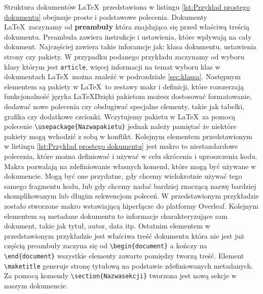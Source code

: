

Struktura dokumentów \LaTeX\ przedstawiona w listingu \ref{lst:Przykład prostego dokumentu} obejmuje proste i podstawowe polecenia. Dokumenty \LaTeX\ zaczynamy od \textbf{preambuły} która znajdująca się przed właściwą treścią dokumentu. Preambuła zawiera instrukcje i ustawienia, które wpływają na cały dokument. Najczęściej zawiera takie inforamcje jak: klasa dokumentu, ustawienia strony czy pakiety. W przypadku podanego przykładu zaczynamy od wyboru klasy którym jest \texttt{article}, więcej informacji na temat wyboru klas w dokumentach \LaTeX\ można znaleźć w podrozdziale \ref{sec:klassa}. Następnym elementem są pakiety w \LaTeX\ to zestawy makr i definicji, które rozszerzają funkcjonalność języka \LaTeX\. Dzięki pakietom możesz dostosować formatowanie, dodawać nowe polecenia czy obsługiwać specjalne elementy, takie jak tabelki, grafika czy dodatkowe czcionki. Wczytujemy pakietu w \LaTeX\ za pomocą polecenie \texttt{\textbackslash usepackage{\{Nazwa\textunderscore pakietu\}}} jednak należy pamiętać że niektóre pakiety mogą wchodzić z sobą w konflikt. Kolejnym elementem przedstawionym w listingu \ref{lst:Przykład prostego dokumentu} jest makro to niestandardowe polecenia, które można definiować i używać w celu skrócenia i uproszczenia kodu. Makra pozwalają na zdefiniowanie własnych komend, które mogą być używane w dokumencie. Mogą być one przydatne, gdy chcemy wielokrotnie używać tego samego fragmentu kodu, lub gdy chcemy nadać bardziej znaczącą nazwę bardziej skomplikowanym lub długim sekwencjom poleceń. W przedstawionym przykładzie zostało stworzone makro wstawiającą hiperłącze do platformy Overleaf. Kolejnym elementem są metadane dokumentu to informacje charakteryzujące sam dokument, takie jak tytuł, autor, data itp. Ostatnim elementem w przedstawionym przykładzie jest właściwa treść dokumentu która nie jest już częścią preambuły zaczyna się od \texttt{\textbackslash begin\{document\}} a kończy na \texttt{\textbackslash end\{document\}} wszystkie elementy zawarte pomiędzy tworzą treść. Element \texttt{\textbackslash maketitle} generuje stronę tytułową na podstawie zdefiniowanych metadanych. Za pomocą komendy \texttt{\textbackslash section\{Nazwa\textunderscore sekcji\}} tworzona jest nową sekcje w naszym dokumencie.
\clearpage 
